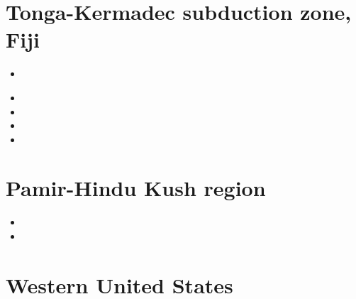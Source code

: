 \section{Tonga-Kermadec subduction zone, Fiji }

\begin{scriptsize}
\begin{itemize}
\item[\twothousandthree] 
 \\
\item[\twothousandsix] 
\item[\twothousandsixteen] 
\item[\twothousandseventeen] 
\item[\twothousandtwentyone] 
\end{itemize}
\end{scriptsize}

\section{Pamir-Hindu Kush region}

\begin{scriptsize}
\begin{itemize}
\item[\twothousandseven]
\item[\twothousandsixteen]
\end{itemize}
\end{scriptsize}

\section{Western United States}

